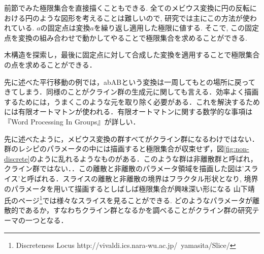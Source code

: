 前節でみた極限集合を直接描くこともできる. 
全てのメビウス変換に円の反転における円のような図形を考えることは難しいので, 研究では主にこの方法が使われている. 
$a$の固定点は変換$a$を繰り返し適用した極限に値する. 
そこで, この固定点を変換の組み合わせで動かしてやることで極限集合を求めることができる. 

木構造を探索し，最後に固定点に対して合成した変換を適用することで極限集合の点を求めることができる．

先に述べた平行移動の例では，abABという変換は一周してもとの場所に戻ってきてしまう．同様のことがクライン群の生成元に関しても言える．効率よく描画するためには，うまくこのような元を取り除く必要がある．これを解決するためには有限オートマトンが使われる．有限オートマトンに関する数学的な事項は『Word Processing In Groups』\cite{wordProcessing}が詳しい．

先に述べたように，メビウス変換の群すべてがクライン群になるわけではない．群のレシピのパラメータの中には描画すると極限集合が収束せず，図\ref{fig:non-discrete}のように乱れるようなものがある．このような群は非離散群と呼ばれ，クライン群ではない．．この離散と非離散のパラメータ領域を描画した図は'スライス'と呼ばれる．スライスの離散と非離散の境界はフラクタル形状となり, 境界のパラメータを用いて描画するとしばしば極限集合が興味深い形になる
山下靖氏のページ\footnote{Discreteness Locus http://vivaldi.ics.nara-wu.ac.jp/~yamasita/Slice/}では様々なスライスを見ることができる. どのようなパラメータが離散的であるか，すなわちクライン群となるかを調べることがクライン群の研究テーマの一つとなる．

